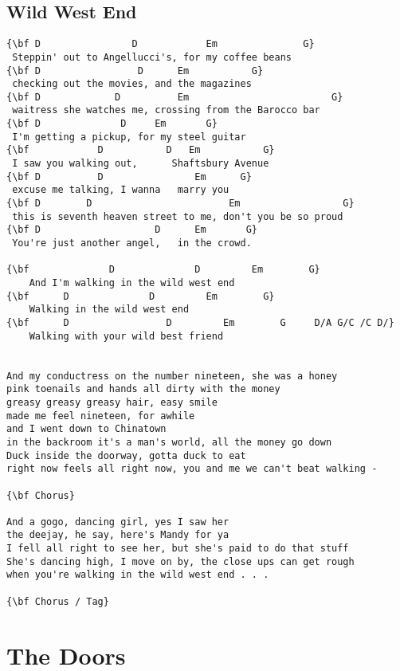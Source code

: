 \documentclass[a4paper]{article}
\begin{document}
\subsection{Wild West End}
\begin{Verbatim}[commandchars=\\\{\}]
{\bf D                D            Em               G}
 Steppin' out to Angellucci's, for my coffee beans
{\bf D                 D      Em           G}
 checking out the movies, and the magazines
{\bf D             D          Em                         G}
 waitress she watches me, crossing from the Barocco bar
{\bf D              D     Em       G}
 I'm getting a pickup, for my steel guitar
{\bf            D           D   Em           G}
 I saw you walking out,      Shaftsbury Avenue
{\bf D          D                Em      G}
 excuse me talking, I wanna   marry you
{\bf D        D                        Em                  G}
 this is seventh heaven street to me, don't you be so proud
{\bf D                    D      Em       G}
 You're just another angel,   in the crowd. 

{\bf              D              D         Em        G}
	And I'm walking in the wild west end
{\bf      D              D         Em        G}
	Walking in the wild west end
{\bf      D                 D         Em        G     D/A G/C /C D/}
	Walking with your wild best friend


And my conductress on the number nineteen, she was a honey
pink toenails and hands all dirty with the money
greasy greasy greasy hair, easy smile
made me feel nineteen, for awhile
and I went down to Chinatown
in the backroom it's a man's world, all the money go down
Duck inside the doorway, gotta duck to eat
right now feels all right now, you and me we can't beat walking -

{\bf Chorus}

And a gogo, dancing girl, yes I saw her
the deejay, he say, here's Mandy for ya
I fell all right to see her, but she's paid to do that stuff
She's dancing high, I move on by, the close ups can get rough
when you're walking in the wild west end . . .

{\bf Chorus / Tag}

\end{Verbatim}
\newpage
\section{The Doors}
\end{document}
